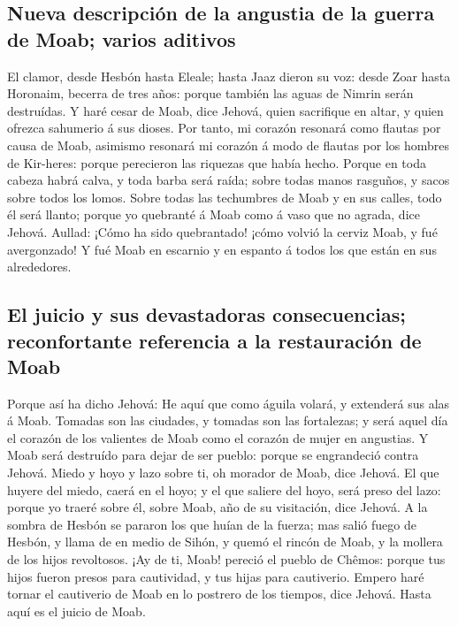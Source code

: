 \hypertarget{nueva-descripciuxf3n-de-la-angustia-de-la-guerra-de-moab-varios-aditivos}{%
\subsection{Nueva descripción de la angustia de la guerra de Moab;
varios
aditivos}\label{nueva-descripciuxf3n-de-la-angustia-de-la-guerra-de-moab-varios-aditivos}}

 El clamor, desde Hesbón hasta Eleale; hasta Jaaz dieron su
voz: desde Zoar hasta Horonaim, becerra de tres años: porque también las
aguas de Nimrin serán destruídas.  Y haré cesar de Moab,
dice Jehová, quien sacrifique en altar, y quien ofrezca sahumerio á sus
dioses.  Por tanto, mi corazón resonará como flautas por
causa de Moab, asimismo resonará mi corazón á modo de flautas por los
hombres de Kir-heres: porque perecieron las riquezas que había hecho.
 Porque en toda cabeza habrá calva, y toda barba será
raída; sobre todas manos rasguños, y sacos sobre todos los lomos.
 Sobre todas las techumbres de Moab y en sus calles, todo
él será llanto; porque yo quebranté á Moab como á vaso que no agrada,
dice Jehová.  Aullad: ¡Cómo ha sido quebrantado! ¡cómo
volvió la cerviz Moab, y fué avergonzado! Y fué Moab en escarnio y en
espanto á todos los que están en sus alrededores.

\hypertarget{el-juicio-y-sus-devastadoras-consecuencias-reconfortante-referencia-a-la-restauraciuxf3n-de-moab}{%
\subsection{El juicio y sus devastadoras consecuencias; reconfortante
referencia a la restauración de
Moab}\label{el-juicio-y-sus-devastadoras-consecuencias-reconfortante-referencia-a-la-restauraciuxf3n-de-moab}}

 Porque así ha dicho Jehová: He aquí que como águila
volará, y extenderá sus alas á Moab.  Tomadas son las
ciudades, y tomadas son las fortalezas; y será aquel día el corazón de
los valientes de Moab como el corazón de mujer en angustias.
 Y Moab será destruído para dejar de ser pueblo: porque se
engrandeció contra Jehová.  Miedo y hoyo y lazo sobre ti,
oh morador de Moab, dice Jehová.  El que huyere del miedo,
caerá en el hoyo; y el que saliere del hoyo, será preso del lazo: porque
yo traeré sobre él, sobre Moab, año de su visitación, dice Jehová.
 A la sombra de Hesbón se pararon los que huían de la
fuerza; mas salió fuego de Hesbón, y llama de en medio de Sihón, y quemó
el rincón de Moab, y la mollera de los hijos revoltosos. 
¡Ay de ti, Moab! pereció el pueblo de Chêmos: porque tus hijos fueron
presos para cautividad, y tus hijas para cautiverio. 
Empero haré tornar el cautiverio de Moab en lo postrero de los tiempos,
dice Jehová. Hasta aquí es el juicio de Moab.

